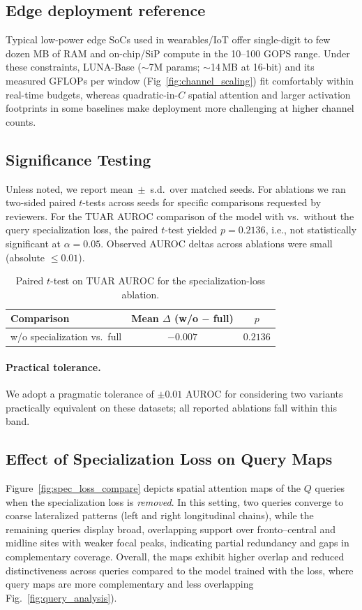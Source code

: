 \subsection{Edge deployment reference}
Typical low-power edge SoCs used in wearables/IoT offer single-digit to few dozen MB of RAM and on-chip/SiP compute in the 10--100 GOPS range. Under these constraints, LUNA-Base ($\sim$7M params; $\sim$14\,MB at 16-bit) and its measured GFLOPs per window (Fig~\ref{fig:channel_scaling}) fit comfortably within real-time budgets, whereas quadratic-in-$C$ spatial attention and larger activation footprints in some baselines make deployment more challenging at higher channel counts.

\subsection{Significance Testing}
\label{app:sig_tests}
Unless noted, we report mean~$\pm$~s.d.\ over matched seeds. For ablations we ran two-sided paired $t$-tests across seeds for specific comparisons requested by reviewers. For the TUAR AUROC comparison of the model with vs.\ without the query specialization loss, the paired $t$-test yielded $p{=}0.2136$, i.e., not statistically significant at $\alpha{=}0.05$. Observed AUROC deltas across ablations were small (absolute $\le 0.01$).

\begin{table}[h]
\centering
\caption{Paired $t$-test on TUAR AUROC for the specialization-loss ablation.}
\label{tab:sig_tests}
\small
\begin{tabular}{lcc}
\toprule
Comparison & Mean $\Delta$ (w/o $-$ full) & $p$ \\
\midrule
w/o specialization vs.\ full & $-0.007$ & $0.2136$ \\
\bottomrule
\end{tabular}
\end{table}

\paragraph{Practical tolerance.}
We adopt a pragmatic tolerance of $\pm 0.01$ AUROC for considering two variants practically equivalent on these datasets; all reported ablations fall within this band.

\subsection{Effect of Specialization Loss on Query Maps}
\label{app:spec_loss_viz}
Figure~\ref{fig:spec_loss_compare} depicts spatial attention maps of the $Q$ queries when the specialization loss is \emph{removed}. In this setting, two queries converge to coarse lateralized patterns (left and right longitudinal chains), while the remaining queries display broad, overlapping support over fronto–central and midline sites with weaker focal peaks, indicating partial redundancy and gaps in complementary coverage. Overall, the maps exhibit higher overlap and reduced distinctiveness across queries compared to the model trained with the loss, where query maps are more complementary and less overlapping Fig.~\ref{fig:query_analysis}).


